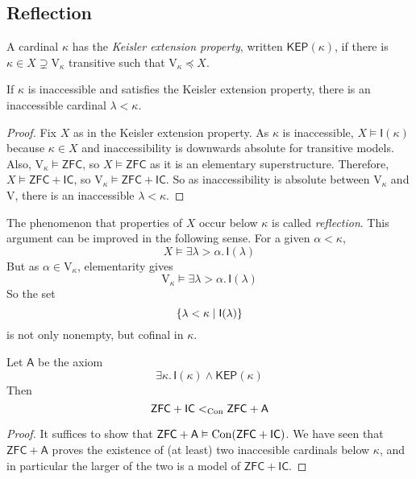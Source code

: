 \subsection{Reflection}
\begin{definition}
    A cardinal \( \kappa \) has the \emph{Keisler extension property}, written \( \mathsf{KEP}(\kappa) \), if there is \( \kappa \in X \supsetneq \mathrm{V}_\kappa \) transitive such that \( \mathrm{V}_\kappa \preceq X \).
\end{definition}
\begin{proposition}
    If \( \kappa \) is inaccessible and satisfies the Keisler extension property, there is an inaccessible cardinal \( \lambda < \kappa \).
\end{proposition}
\begin{proof}
    Fix \( X \) as in the Keisler extension property.
    As \( \kappa \) is inaccessible, \( X \vDash \mathsf{I}(\kappa) \) because \( \kappa \in X \) and inaccessibility is downwards absolute for transitive models.
    Also, \( \mathrm{V}_\kappa \vDash \mathsf{ZFC} \), so \( X \vDash \mathsf{ZFC} \) as it is an elementary superstructure.
    Therefore, \( X \vDash \mathsf{ZFC} + \mathsf{IC} \), so \( \mathrm{V}_\kappa \vDash \mathsf{ZFC} + \mathsf{IC} \).
    So as inaccessibility is absolute between \( \mathrm{V}_\kappa \) and \( \mathrm{V} \), there is an inaccessible \( \lambda < \kappa \).
\end{proof}
The phenomenon that properties of \( X \) occur below \( \kappa \) is called \emph{reflection}.
This argument can be improved in the following sense.
For a given \( \alpha < \kappa \),
\[ X \vDash \exists \lambda > \alpha.\, \mathsf{I}(\lambda) \]
But as \( \alpha \in \mathrm{V}_\kappa \), elementarity gives
\[ \mathrm{V}_\kappa \vDash \exists \lambda > \alpha.\, \mathsf{I}(\lambda) \]
So the set
\[ \qty{\lambda < \kappa \mid \mathsf{I}(\lambda)} \]
is not only nonempty, but cofinal in \( \kappa \).
\begin{corollary}
    Let \( \mathsf{A} \) be the axiom
    \[ \exists \kappa.\, \mathsf{I}(\kappa) \wedge \mathsf{KEP}(\kappa) \]
    Then
    \[ \mathsf{ZFC} + \mathsf{IC} <_{\operatorname{Con}} \mathsf{ZFC} + \mathsf{A} \]
\end{corollary}
\begin{proof}
    It suffices to show that \( \mathsf{ZFC} + \mathsf{A} \vDash \operatorname{Con}(\mathsf{ZFC} + \mathsf{IC}) \).
    We have seen that \( \mathsf{ZFC} + \mathsf{A} \) proves the existence of (at least) two inaccesible cardinals below \( \kappa \), and in particular the larger of the two is a model of \( \mathsf{ZFC} + \mathsf{IC} \).
\end{proof}
